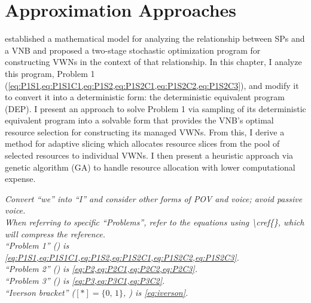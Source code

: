 \documentclass[12pt,dvipsnames]{report}
\begin{document}
\iftrue
\pagebreak
\chapter{Approximation Approaches} \label{ch:approaches}

 established a mathematical model for analyzing the relationship between SPs and a VNB and proposed a two-stage stochastic optimization program for constructing VWNs in the context of that relationship.  In this chapter, I analyze this program, Problem 1 (\cref{eq:P1S1,eq:P1S1C1,eq:P1S2,eq:P1S2C1,eq:P1S2C2,eq:P1S2C3}), and modify it to convert it into a deterministic form: the deterministic equivalent program (DEP).  I present an approach to solve Problem 1 via sampling of its deterministic equivalent program into a solvable form that provides the VNB's optimal resource selection for constructing its managed VWNs.  From this, I derive a method for adaptive slicing which allocates resource slices from the pool of selected resources to individual VWNs.  I then present a heuristic approach via genetic algorithm (GA) to handle resource allocation with lower computational expense.

%
\textit{Convert ``we'' into ``I'' and consider other forms of POV and voice; avoid passive voice.\\When referring to specific ``Problems'', refer to the equations using \textbackslash cref\{\}, which will compress the reference.\\``Problem 1'' () is \cref{eq:P1S1,eq:P1S1C1,eq:P1S2,eq:P1S2C1,eq:P1S2C2,eq:P1S2C3}.\\``Problem 2'' () is \cref{eq:P2,eq:P2C1,eq:P2C2,eq:P2C3}.\\``Problem 3'' () is \cref{eq:P3,eq:P3C1,eq:P3C2}.\\``Iverson bracket'' ($[*]=\{0,\, 1\}$, ) is \cref{eq:iverson}.}


\end{document}
